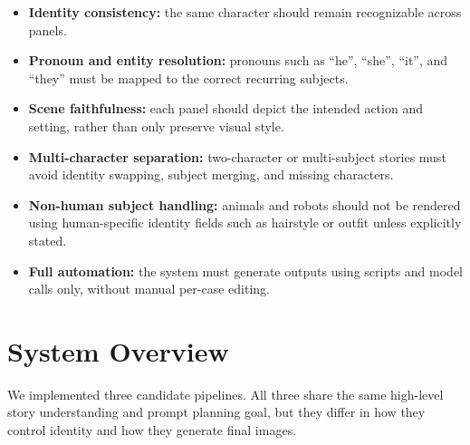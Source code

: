 \documentclass[11pt,a4paper]{article}
\begin{document}
\begin{itemize}[leftmargin=*]
    \item \textbf{Identity consistency:} the same character should remain recognizable across panels.
    \item \textbf{Pronoun and entity resolution:} pronouns such as ``he'', ``she'', ``it'', and ``they'' must be mapped to the correct recurring subjects.
    \item \textbf{Scene faithfulness:} each panel should depict the intended action and setting, rather than only preserve visual style.
    \item \textbf{Multi-character separation:} two-character or multi-subject stories must avoid identity swapping, subject merging, and missing characters.
    \item \textbf{Non-human subject handling:} animals and robots should not be rendered using human-specific identity fields such as hairstyle or outfit unless explicitly stated.
    \item \textbf{Full automation:} the system must generate outputs using scripts and model calls only, without manual per-case editing.
\end{itemize}

\section{System Overview}

We implemented three candidate pipelines. All three share the same high-level story understanding and prompt planning goal, but they differ in how they control identity and how they generate final images.
\end{document}
